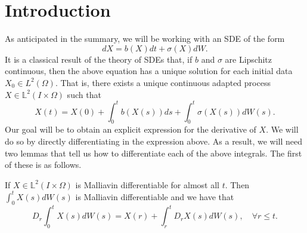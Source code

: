 \documentclass[
    a4paper,
    DIV=14,
    abstract=true,
    numbers=noenddot
]{scrartcl}
\begin{document}
\section{Introduction}
As anticipated in the summary, we will be working with an SDE of the form
\begin{equation}\label{SDE}
	dX=b(X) d t +\sigma (X)dW .
\end{equation}
It is a classical result of the theory of SDEs that, if $b$ and  $\sigma $ are Lipschitz continuous, then the above equation has a unique solution for each initial data $X_0\in L^2(\Omega)$. That is, there exists a unique continuous adapted process $X\in \mathbb{L}^2(I\times\Omega)$ such that
\begin{equation}\label{X expression}
	X(t)=X(0)+\int_{0}^t b(X(s)) ds+\int_{0}^t \sigma(X(s))  dW(s).
\end{equation}
Our goal will be to obtain an explicit expression for the derivative of $X$. We will do so by directly differentiating in the expression above. As a result, we will need two lemmas that tell us how to differentiate each of the above integrals. The first of these is as follows.
\begin{lemma}
	If $X\in \mathbb{L}^2(I\times\Omega)$ is  Malliavin differentiable for almost all $t$. Then $\int_{0}^t X(s) dW(s)$ is Malliavin differentiable and we have that
	\begin{equation*}
		D_r \int_{0}^t X(s) dW(s)=X(r)+\int_{r}^t D_r X(s) dW(s), \quad\forall r\leq t.
	\end{equation*}
\end{lemma}
\end{document}
